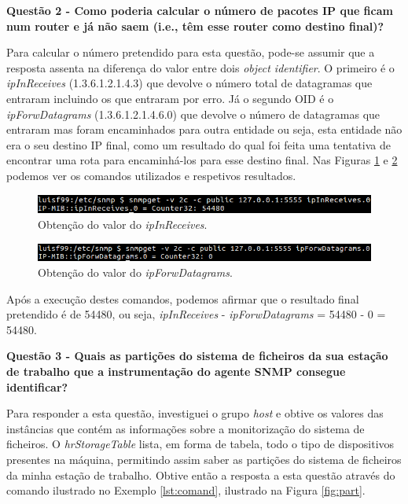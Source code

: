 \documentclass[../momento_1.tex]{subfiles}
\begin{document}
\textbf{Questão 2 - Como poderia calcular o número de pacotes IP que ficam num router e já não saem
(i.e., têm esse router como destino final)?}\par

Para calcular o número pretendido para esta questão, pode-se assumir que a resposta assenta na diferença do valor entre dois \textit{object identifier}.
O primeiro é o \textit{ipInReceives} (1.3.6.1.2.1.4.3) que devolve o número total de datagramas que entraram incluindo os que entraram por erro. Já o segundo OID é o \textit{ipForwDatagrams} (1.3.6.1.2.1.4.6.0) que devolve o número de datagramas que entraram mas foram encaminhados para outra entidade ou seja, esta entidade não era o seu destino IP final, como um resultado do qual foi feita uma tentativa de encontrar uma rota para encaminhá-los para esse destino final. Nas Figuras \ref{fig:rec} e \ref{fig:forw} podemos ver os comandos utilizados e respetivos resultados.\par

\begin{figure}[H]
\centering
\captionsetup{justification=centering,margin=2cm}
\centerline{\includegraphics[scale=0.6]{../imagens/ipInReceives.png}}
\caption{Obtenção do valor do \textit{ipInReceives}.}
\label{fig:rec}
\end{figure}

\begin{figure}[H]
\centering
\captionsetup{justification=centering,margin=2cm}
\centerline{\includegraphics[scale=0.6]{../imagens/ipForwDatagrams.png}}
\caption{Obtenção do valor do \textit{ipForwDatagrams}.}
\label{fig:forw}
\end{figure}

Após a execução destes comandos, podemos afirmar que o resultado final pretendido é de 54480, ou seja, \textit{ipInReceives} - \textit{ipForwDatagrams} = 54480 - 0 = 54480.\par 

\textbf{Questão 3 - Quais as partições do sistema de ficheiros da sua estação de trabalho que a
instrumentação do agente SNMP consegue identificar?}\par

Para responder a esta questão, investiguei o grupo \textit{host} e obtive os valores das instâncias que contém as informações sobre a monitorização do sistema de ficheiros. O \textit{hrStorageTable} lista, em forma de tabela, todo o tipo de dispositivos presentes na máquina, permitindo assim saber as partições do sistema de ficheiros da minha estação de trabalho. Obtive então a resposta a esta questão através do comando ilustrado no Exemplo \ref{lst:comand}, ilustrado na Figura \ref{fig:part}.
\end{document}
